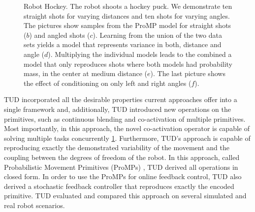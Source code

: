 \begin{figure}
\centering
{}

\vspace{0.2em}


\caption{Robot Hockey. The robot shoots a hockey puck. We demonstrate ten straight
shots for varying distances and ten shots for varying angles. The
pictures show samples from the ProMP model for straight shots ($b$)
and angled shots ($c$). Learning from the union of the two data sets yields a model
that represents variance in both, distance and angle ($d$). Multiplying
the individual models leads to the combined a model that only reproduces shots
where both models had probability mass, in the center at medium distance
($e$). The last picture shows the effect of conditioning on only left
and right angles ($f$).}
\label{fig:Robot-Hockey}

\end{figure}

TUD incorporated all the desirable properties 
current approaches offer into a single framework and, additionally, TUD 
introduced new operations on the primitives, such as continuous blending and
co-activation of multiple primitives.  Most importantly, in this approach, the
novel co-activation operator is capable of solving multiple tasks concurrently \ref{fig:Robot-Hockey}.
Furthermore, TUD's approach is capable of reproducing exactly the demonstrated
variability of the movement and the coupling between the degrees of freedom of
the robot.  In this approach, called Probabilistic Movement Primitives (ProMPs) \cite{Paraschos2013,Paraschos2013a},
TUD derived all operations in closed form. In order to use the ProMPs for online
feedback control, TUD also derived a stochastic feedback controller that
reproduces exactly the encoded primitive. TUD evaluated and compared this approach
on several simulated and real robot scenarios.

